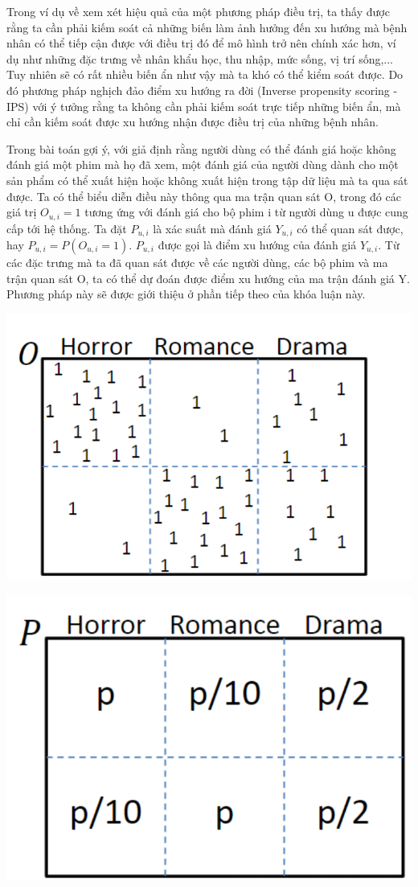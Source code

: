 Trong ví dụ về xem xét hiệu quả của một phương pháp điều trị, ta thấy được rằng ta cần phải kiếm soát cả những biến làm ảnh hưởng đến xu hướng mà bệnh nhân có thể tiếp cận được với điều trị đó để mô hình trở nên chính xác hơn, ví dụ như những đặc trưng về nhân khẩu học, thu nhập, mức sống, vị trí sống,... Tuy nhiên sẽ có rất nhiều biến ẩn như vậy mà ta khó có thể kiểm soát  được. Do đó phương pháp nghịch đảo điểm xu hướng ra đời (Inverse propensity scoring - IPS) với ý tưởng rằng ta không cần phải kiếm soát trực tiếp những biến ẩn, mà chỉ cần kiếm soát được xu hướng nhận được điều trị của những bệnh nhân. 

Trong bài toán gợi ý, với giả định rằng người dùng có thể đánh giá hoặc không đánh giá một phim mà họ đã xem, một đánh giá của người dùng dành cho một sản phẩm có thể xuất hiện hoặc không xuất hiện trong tập dữ liệu mà ta qua sát được. Ta có thể biểu diễn điều này thông qua ma trận quan sát O, trong đó các giá trị $O_{u,i}=1$ tương ứng với đánh giá cho bộ phim i từ người dùng u được cung cấp tới hệ thống. Ta đặt $P_{u,i}$ là xác suất mà đánh giá $Y_{u,i}$ có thể quan sát được, hay  $P_{u,i} = P(O_{u,i} = 1)$.  $P_{u,i}$ được gọi là điểm xu hướng của đánh giá  $Y_{u,i}$. Từ các đặc trưng mà ta đã quan sát được về các người dùng, các bộ phim và ma trận quan sát O, ta có thể dự đoán được điểm xu hướng của ma trận đánh giá Y. Phương pháp này sẽ được giới thiệu ở phần tiếp theo của khóa luận này.


\includegraphics[scale=0.85]{images/O.png}


\includegraphics[scale=0.85]{images/P.png}


